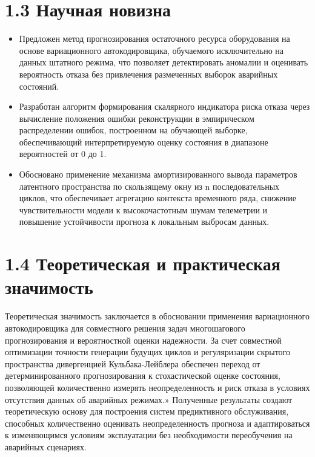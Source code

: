 \documentclass[14pt, a4paper, oneside]{extreport}
\begin{document}
\vspace{1em}
\section{1.3 Научная новизна}
\vspace{1em}
\begin{itemize}
    \item Предложен метод прогнозирования остаточного ресурса оборудования на основе вариационного автокодировщика, обучаемого исключительно на данных штатного режима, что позволяет детектировать аномалии и оценивать вероятность отказа без привлечения размеченных выборок аварийных состояний.
    \item Разработан алгоритм формирования скалярного индикатора риска отказа через вычисление положения ошибки реконструкции в эмпирическом распределении ошибок, построенном на обучающей выборке, обеспечивающий интерпретируемую оценку состояния в диапазоне вероятностей от 0 до 1.
    \item Обосновано применение механизма амортизированного вывода параметров латентного пространства по скользящему окну из n последовательных циклов, что обеспечивает агрегацию контекста временного ряда, снижение чувствительности модели к высокочастотным шумам телеметрии и повышение устойчивости прогноза к локальным выбросам данных.
\end{itemize}

\vspace{1em}
\section{1.4 Теоретическая и практическая значимость}
\vspace{1em}
Теоретическая значимость заключается в обосновании применения вариационного автокодировщика для совместного решения задач многошагового прогнозирования и вероятностной оценки надежности. За счет совместной оптимизации точности генерации будущих циклов и регуляризации скрытого пространства дивергенцией Кульбака-Лейблера обеспечен переход от детерминированного прогнозирования к стохастической оценке состояния, позволяющей количественно измерять неопределенность и риск отказа в условиях отсутствия данных об аварийных режимах.»
Полученные результаты создают теоретическую основу для построения систем предиктивного обслуживания, способных количественно оценивать неопределенность прогноза и адаптироваться к изменяющимся условиям эксплуатации без необходимости переобучения на аварийных сценариях.
\end{document}
